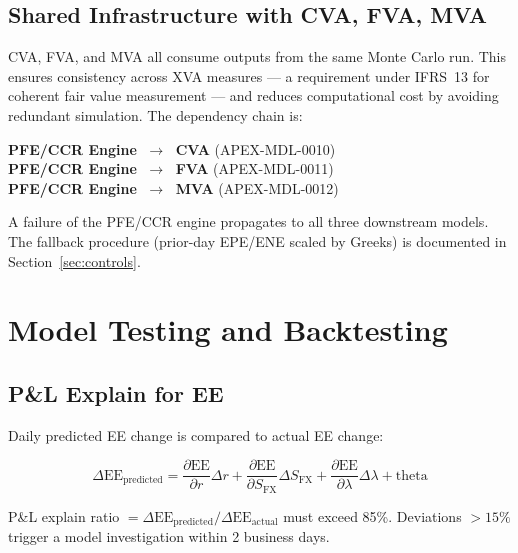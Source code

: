 \documentclass[11pt,a4paper]{article}
\begin{document}
\subsection{Shared Infrastructure with CVA, FVA, MVA}

CVA, FVA, and MVA all consume outputs from the same Monte Carlo run. This
ensures consistency across XVA measures --- a requirement under IFRS~13 for
coherent fair value measurement --- and reduces computational cost by avoiding
redundant simulation. The dependency chain is:

\begin{center}
  \textbf{PFE/CCR Engine} $\;\longrightarrow\;$ \textbf{CVA} (APEX-MDL-0010)\\[2pt]
  \textbf{PFE/CCR Engine} $\;\longrightarrow\;$ \textbf{FVA} (APEX-MDL-0011)\\[2pt]
  \textbf{PFE/CCR Engine} $\;\longrightarrow\;$ \textbf{MVA} (APEX-MDL-0012)
\end{center}

A failure of the PFE/CCR engine propagates to all three downstream models.
The fallback procedure (prior-day EPE/ENE scaled by Greeks) is documented
in Section~\ref{sec:controls}.

\section{Model Testing and Backtesting}

\subsection{P\&L Explain for EE}

Daily predicted EE change is compared to actual EE change:

\begin{equation}
  \Delta\text{EE}_{\text{predicted}}
    = \frac{\partial \text{EE}}{\partial r} \Delta r
    + \frac{\partial \text{EE}}{\partial S_{\text{FX}}} \Delta S_{\text{FX}}
    + \frac{\partial \text{EE}}{\partial \lambda} \Delta\lambda
    + \text{theta}
\end{equation}

P\&L explain ratio $= \Delta\text{EE}_{\text{predicted}} / \Delta\text{EE}_{\text{actual}}$
must exceed 85\%. Deviations $>15\%$ trigger a model investigation within
2 business days.
\end{document}
